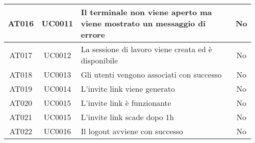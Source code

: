 \documentclass[../main.tex]{subfiles}
\begin{document}
\begin{tabularx}{\linewidth}{|c|c|X|c|}
    AT016       & UC0011    & Il terminale non viene aperto ma viene mostrato un messaggio di errore & No \\ \hline
    AT017       & UC0012    & La sessione di lavoro viene creata ed è disponibile & No \\ \hline
    AT018       & UC0013    & Gli utenti vengono associati con successo & No \\ \hline
    AT019       & UC0014    & L'invite link viene generato & No \\ \hline
    AT020       & UC0015    & L'invite link è funzionante & No \\ \hline
    AT021       & UC0015    & L'invite link scade dopo 1h & No \\ \hline
    AT022       & UC0016    & Il logout avviene con successo & No \\ \hline
\end{tabularx}
\end{document}
